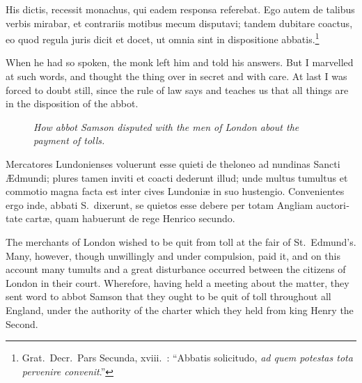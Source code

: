 \documentclass[10pt]{book}
\newcommand{\blockhead}[4][]{
\begin{figure}
\centering
\vspace{#4}
\parbox{2.75cm}{\begin{center}\footnotesize \color{BrickRed} \emph{#2}\\ #1 \end{center}}
\end{figure}
}
\begin{document}
\begin{paracol}{2}
\switchcolumn*

\begin{otherlanguage}{latin}
His dictis, recessit monachus, qui eadem responsa referebat. Ego autem de talibus verbis mirabar, et contrariis motibus mecum disputavi; tandem dubitare coactus, eo quod regula juris dicit et docet, ut omnia sint in dispositione abbatis.\footnote[\textdagger]{Grat.\ Decr.\ Pars Secunda, xviii.\ : ``Abbatis solicitudo, \emph{ad quem potestas tota pervenire convenit}.''}
\end{otherlanguage}

\switchcolumn

When he had so spoken, the monk left him and told his answers. But I marvelled at such words, and thought the thing over in secret and with care. At last I was forced to doubt still, since the rule of law says and teaches us that all things are in the disposition of the abbot.

\switchcolumn*

\begin{otherlanguage}{latin}
\blockhead{How abbot Samson disputed with the men of London about the payment of tolls.}{4}{-.65cm}
Mercatores Lundonienses voluerunt esse quieti de theloneo ad nundinas Sancti \AE{}dmundi; plures tamen inviti et coacti dederunt illud; unde multus tumultus et commotio magna facta est inter cives Lundoni\ae{} in suo hustengio. Convenientes ergo inde, abbati S.\ dixerunt, se quietos esse debere per totam Angliam auctoritate cart\ae{}, quam habuerunt de rege Henrico secundo.

\end{otherlanguage}

\switchcolumn

The merchants of London wished to be quit from toll at the fair of St.\ Edmund's. Many, however, though unwillingly and under compulsion, paid it, and on this account many tumults and a great disturbance occurred between the citizens of London in their court. Wherefore, having held a meeting about the matter, they sent word to abbot Samson that they ought to be quit of toll throughout all England, under the authority of the charter which they held from king Henry the Second.

\switchcolumn*


\end{paracol}
\end{document}
